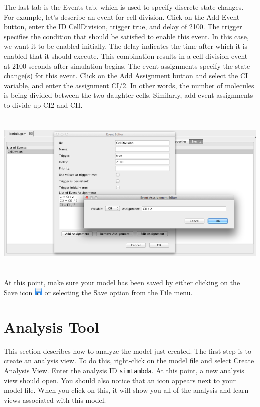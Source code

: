 \documentclass[titlepage,11pt]{article}
\begin{document}
The last tab is the Events tab, which is used to specify discrete state changes.  For example, let's describe an event for cell division.  Click on the Add Event button, enter the ID CellDivision, trigger true, and delay of 2100.  The trigger specifies the condition that should be satisfied to enable this event.  In this case, we want it to be enabled initially.  The delay indicates the time after which it is enabled that it should execute.  This combination results in a cell division event at 2100 seconds after simulation begins.  The event assignments specify the state change(s) for this event.  Click on the Add Assignment button and select the CI variable, and enter the assignment CI/2.  In other words, the number of molecules is being divided between the two daughter cells.  Similarly, add event assignments to divide up CI2 and CII.

\begin{center}
\includegraphics[height=80mm]{screenshots/event}
\end{center}

At this point, make sure your model has been saved by either clicking on the Save icon \includegraphics{../gui/icons/save} or selecting the Save option from the File menu.

\section{Analysis Tool}

This section describes how to analyze the model just created.  The first step is to create an analysis view.  To do this, right-click on the model file and select Create Analysis View.  Enter the analysis ID {\tt simLambda}.  At this point, a new analysis view should open.  You should also notice that an icon appears next to your model file.  When you click on this, it will show you all of the analysis and learn views associated with this model.
\end{document}
